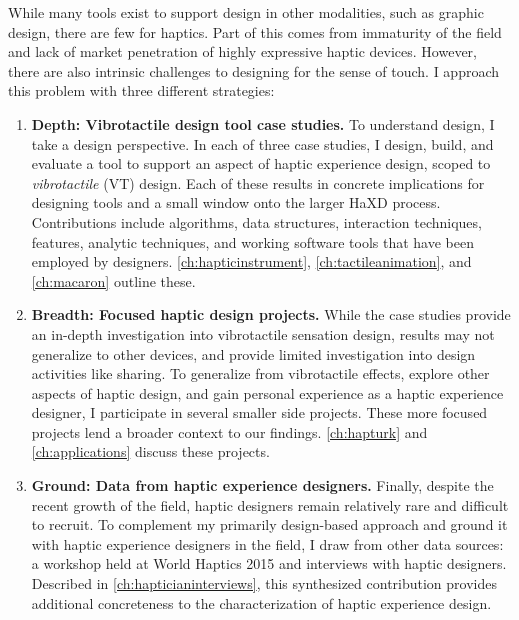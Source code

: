 While many tools exist to support design in other modalities, such as graphic design, there are few for haptics.
Part of this comes from immaturity of the field and lack of market penetration of highly expressive haptic devices.
However, there are also intrinsic challenges to designing for the sense of touch.
I approach this problem with three different strategies:
\begin{enumerate}
\item \textbf{Depth: Vibrotactile design tool case studies.}
To understand design, I take a design perspective.
In each of three case studies, I design, build, and evaluate a tool to support an aspect of haptic experience design, scoped to \emph{vibrotactile} (VT) design.
Each of these results in concrete implications for designing tools and a small window onto the larger HaXD process.
Contributions include algorithms, data structures, interaction techniques, features, analytic techniques, and working software tools that have been employed by designers.
\autoref{ch:hapticinstrument}, \autoref{ch:tactileanimation}, and \autoref{ch:macaron} outline these.

\item \textbf{Breadth: Focused haptic design projects.}
While the case studies provide an in-depth investigation into vibrotactile sensation design, results may not generalize to other devices, and provide limited investigation into design activities like sharing.
To generalize from vibrotactile effects, explore other aspects of haptic design, and gain personal experience as a haptic experience designer, I participate in several smaller side projects.
These more focused projects lend a broader context to our findings.
\autoref{ch:hapturk} and \autoref{ch:applications} discuss these projects.

\item \textbf{Ground: Data from haptic experience designers.}
Finally, despite the recent growth of the field, haptic designers remain relatively rare and difficult to recruit.
To complement my primarily design-based approach and ground it with haptic experience designers in the field, I draw from other data sources: a workshop held at World Haptics 2015 and interviews with haptic designers.
Described in \autoref{ch:hapticianinterviews}, this synthesized contribution provides additional concreteness to the characterization of haptic experience design.
\end{enumerate}



